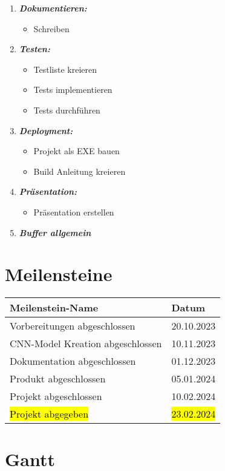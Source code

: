 \begin{enumerate}
	\item \textbf{\emph{Dokumentieren:}} 
	\begin{itemize} 
		\item Schreiben 
	\end{itemize} 

	\item \textbf{\emph{Testen:}} 
	\begin{itemize} 
		\item Testliste kreieren 
		\item Tests implementieren 
		\item Tests durchführen 
	\end{itemize} 

	\item \textbf{\emph{Deployment:}} 
	\begin{itemize} 
		\item Projekt als EXE bauen 
		\item Build Anleitung kreieren 
	\end{itemize} 

	\item \textbf{\emph{Präsentation:}} 
	\begin{itemize} 
		\item Präsentation erstellen 
	\end{itemize}

	\item \textbf{\emph{Buffer allgemein}} 
\end{enumerate} 

\section{Meilensteine} 
\label{sec:PlanungMeilensteine} 
\begin{xltabular}{\linewidth}{|X|X|} 
	\hline Meilenstein-Name & Datum 
	\\\hline Vorbereitungen abgeschlossen & 20.10.2023 
	\\\hline CNN-Model Kreation abgeschlossen & 10.11.2023 
	\\\hline Dokumentation abgeschlossen & 01.12.2023 
	\\\hline Produkt abgeschlossen & 05.01.2024 
	\\\hline Projekt abgeschlossen & 10.02.2024 
	\\\hline \hl{Projekt abgegeben} & \hl{23.02.2024} 
\\\hline 
\end{xltabular}
\label{tab:PlanungMeilensteineTable}

\section{Gantt} 
\label{sec:PlanungGantt} 
\begin{landscape}




\end{landscape}



